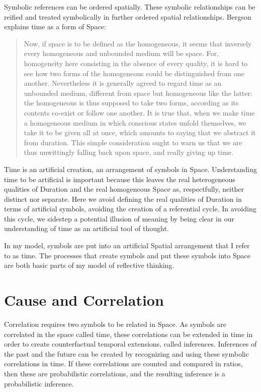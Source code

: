 Symbolic references can be ordered spatially.  These symbolic
relationships can be reified and treated symbolically in further
ordered spatial relationships.  Bergson explains time as a form of
Space:

\begin{quote}
Now, if space is to be defined as the homogeneous, it seems that
inversely every homogeneous and unbounded medium will be space.  For,
homogeneity here consisting in the absence of every quality, it is
hard to see how two forms of the homogeneous could be distinguished
from one another.  Nevertheless it is generally agreed to regard time
as an unbounded medium, different from space but homogeneous like the
latter: the homogeneous is thus supposed to take two forms, according
as its contents co-exist or follow one another.  It is true that, when
we make time a homogeneous medium in which conscious states unfold
themselves, we take it to be given all at once, which amounts to
saying that we abstract it from duration.  This simple consideration
ought to warn us that we are thus unwittingly falling back upon space,
and really giving up time.
\end{quote}

Time is an artificial creation, an arrangement of symbols in Space.
Understanding time to be artificial is important because this leaves
the real heterogeneous qualities of Duration and the real homogeneous
Space as, respectfully, neither distinct nor separate.  Here we avoid
defining the real qualities of Duration in terms of artificial
symbols, avoiding the creation of a referential cycle.  In avoiding
this cycle, we sidestep a potential illusion of meaning by being clear
in our understanding of time as an artificial tool of thought.

In my model, symbols are put into an artificial Spatial arrangement
that I refer to as time.  The processes that create symbols and put
these symbols into Space are both basic parts of my model of
reflective thinking.

\section{Cause and Correlation}

Correlation requires two symbols to be related in Space.  As symbols
are correlated in the space called time, these correlations can be
extended in time in order to create counterfactual temporal
extensions, called inferences.  Inferences of the past and the future
can be created by recognizing and using these symbolic correlations in
time.  If these correlations are counted and compared in ratios, then
these are probabilistic correlations, and the resulting inference is a
probabilistic inference.

